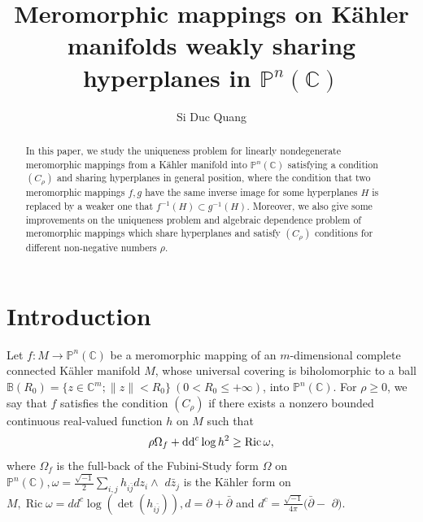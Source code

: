 \documentclass[12pt, a4paper, oneside]{amsart}
\newcommand{\C}{{\mathbb{C}}}
\newcommand{\B}{\mathbb{B}}
\renewcommand{\P}{{\mathbb{P}}}
\numberwithin{equation}{section}
\begin{document}
\title[Meromorphic mappings on K\"{a}hler manifolds weakly sharing hyperplanes]{Meromorphic mappings on K\"{a}hler manifolds weakly sharing hyperplanes in $\P^n(\C)$} 

\author{Si Duc Quang}  
\def\thefootnote{\empty}

\begin{abstract}
In this paper, we study the uniqueness problem for linearly nondegenerate meromorphic mappings from a K\"{a}hler manifold into $\P^n(\C)$ satisfying a condition $(C_\rho)$ and sharing hyperplanes in general position, where the condition that two meromorphic mappings $f,g$  have the same inverse image for some hyperplanes $H$ is replaced by a weaker one that $f^{-1}(H)\subset g^{-1}(H)$. Moreover, we also give some improvements on the uniqueness problem and algebraic dependence problem of meromorphic mappings which share hyperplanes and satisfy $(C_\rho)$ conditions for different non-negative numbers $\rho$. 
\end{abstract}
\maketitle

\section{Introduction}
Let $f: M \rightarrow \P^n(\C)$ be a meromorphic mapping of an $m$-dimensional complete connected K\"{a}hler manifold $M$, whose universal covering is biholomorphic to a ball $\B(R_0)=\{z \in \C^m ;\|z\|<R_0\}\ (0<R_0\le +\infty)$, into $\P^n(\C)$. For $\rho \geq 0$, we say that $f$ satisfies the condition $(C_{\rho})$ if there exists a nonzero bounded continuous real-valued function $h$ on $M$ such that
$$\rho \Omega_{f}+{\rm dd}^{c}\log h^{2} \geq \operatorname{Ric} \omega,$$
where $\Omega_{f}$ is the full-back of the Fubini-Study form $\Omega$ on $\P^n(\C), \omega=\frac{\sqrt{-1}}{2} \sum_{i, j} h_{i \bar{j}} d z_{i} \wedge$ $d \bar{z}_{j}$ is the K\"{a}hler form on $M, \operatorname{Ric} \omega=d d^{c} \log \left(\operatorname{det}\left(h_{i \bar{j}}\right)\right), d=\partial+\bar{\partial}$ and $d^{c}=\frac{\sqrt{-1}}{4 \pi}(\bar{\partial}-$ $\partial)$.
\end{document}
